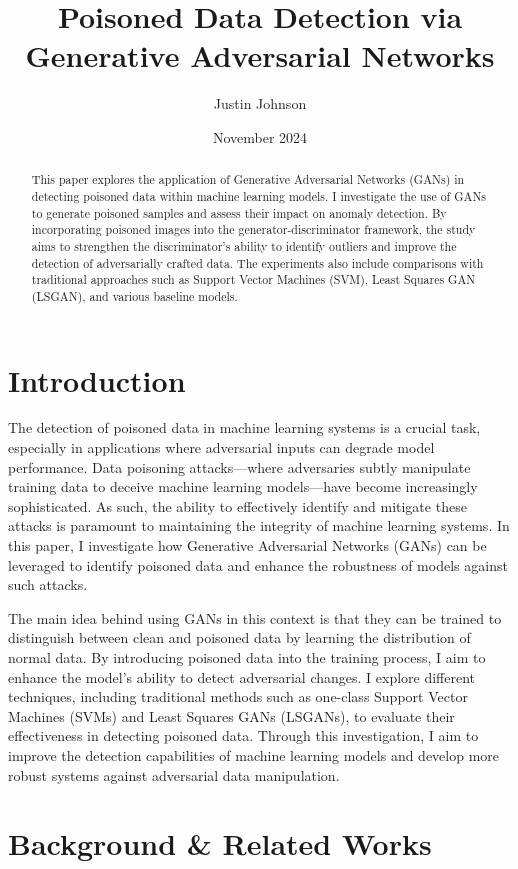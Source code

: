 \documentclass[14]{article}
\title{Poisoned Data Detection via Generative Adversarial Networks}
\author{Justin Johnson}
\date{November 2024}
\begin{document}
\maketitle

\begin{abstract}
This paper explores the application of Generative Adversarial Networks (GANs) in detecting poisoned data within machine learning models. I investigate the use of GANs to generate poisoned samples and assess their impact on anomaly detection. By incorporating poisoned images into the generator-discriminator framework, the study aims to strengthen the discriminator's ability to identify outliers and improve the detection of adversarially crafted data. The experiments also include comparisons with traditional approaches such as Support Vector Machines (SVM), Least Squares GAN (LSGAN), and various baseline models.
\end{abstract}

\section{Introduction}

The detection of poisoned data in machine learning systems is a crucial task, especially in applications where adversarial inputs can degrade model performance. Data poisoning attacks—where adversaries subtly manipulate training data to deceive machine learning models—have become increasingly sophisticated. As such, the ability to effectively identify and mitigate these attacks is paramount to maintaining the integrity of machine learning systems. In this paper, I investigate how Generative Adversarial Networks (GANs) can be leveraged to identify poisoned data and enhance the robustness of models against such attacks.

The main idea behind using GANs in this context is that they can be trained to distinguish between clean and poisoned data by learning the distribution of normal data. By introducing poisoned data into the training process, I aim to enhance the model’s ability to detect adversarial changes. I explore different techniques, including traditional methods such as one-class Support Vector Machines (SVMs) and Least Squares GANs (LSGANs), to evaluate their effectiveness in detecting poisoned data. Through this investigation, I aim to improve the detection capabilities of machine learning models and develop more robust systems against adversarial data manipulation.

\section{Background \& Related Works}
\end{document}
